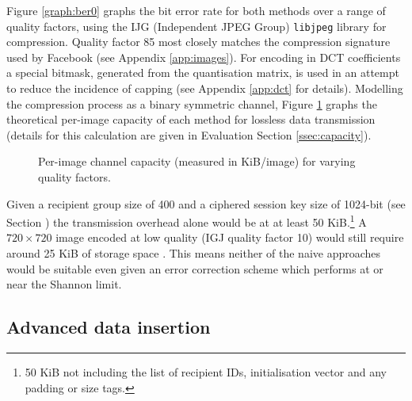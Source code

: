 Figure \ref{graph:ber0} graphs the bit error rate for both methods over a range of quality factors, using the IJG (Independent JPEG Group) {\tt libjpeg} library for compression. Quality factor 85 most closely matches the compression signature used by Facebook (see Appendix \ref{app:images}). For encoding in DCT coefficients a special bitmask, generated from the quantisation matrix, is used in an attempt to reduce the incidence of capping (see Appendix \ref{app:dct} for details). Modelling the compression process as a binary symmetric channel, Figure \ref{graph:capacity0} graphs the theoretical per-image capacity of each method for lossless data transmission (details for this calculation are given in Evaluation Section \ref{ssec:capacity}).


\begin{figure}[tbph]
  \begin{center}
    \caption{Per-image channel capacity (measured in KiB/image) for varying quality factors.}
    \label{graph:capacity0}
  \end{center}
\end{figure}

Given a recipient group size of 400 and a ciphered session key size of 1024-bit (see Section \label{ssec:keys}) the transmission overhead alone would be at at least 50 KiB.\footnote{50 KiB not including the list of recipient IDs, initialisation vector and any padding or size tags.} A $720 \times 720$ image encoded at low quality (IGJ quality factor 10) would still require around 25 KiB of storage space \cite{ijg}. This means neither of the naive approaches would be suitable even given an error correction scheme which performs at or near the Shannon limit. 


\subsection{Advanced data insertion}

